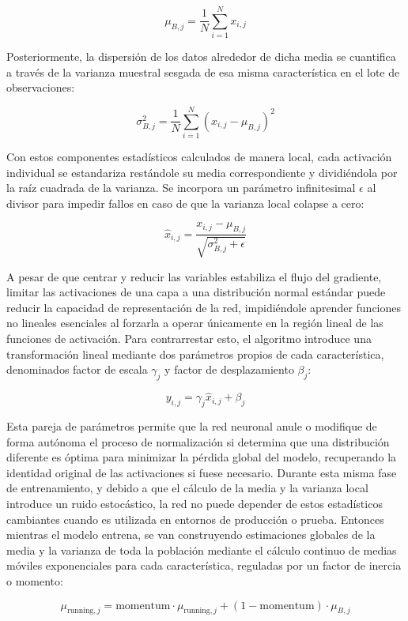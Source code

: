 \documentclass[12pt]{article}
\begin{document}
$$\mu_{B,j} = \frac{1}{N} \sum_{i=1}^{N} x_{i,j}$$

Posteriormente, la dispersión de los datos alrededor de dicha media se cuantifica a 
través de la varianza muestral sesgada de esa misma característica en el lote de observaciones:

$$\sigma_{B,j}^2 = \frac{1}{N} \sum_{i=1}^{N} (x_{i,j} - \mu_{B,j})^2$$

Con estos componentes estadísticos calculados de manera local, cada activación individual 
se estandariza restándole su media correspondiente y dividiéndola por la raíz cuadrada de 
la varianza. Se incorpora un parámetro infinitesimal $\epsilon$ al divisor para impedir 
fallos en caso de que la varianza local colapse a cero:

$$\hat{x}_{i,j} = \frac{x_{i,j} - \mu_{B,j}}{\sqrt{\sigma_{B,j}^2 + \epsilon}}$$

A pesar de que centrar y reducir las variables estabiliza el flujo del gradiente, 
limitar las activaciones de una capa a una distribución normal estándar puede reducir 
la capacidad de representación de la red, impidiéndole aprender funciones no lineales 
esenciales al forzarla a operar únicamente en la región lineal de las funciones de activación. 
Para contrarrestar esto, el algoritmo introduce una transformación lineal mediante dos 
parámetros propios de cada característica, denominados factor de escala $\gamma_j$ y factor 
de desplazamiento $\beta_j$:

$$y_{i,j} = \gamma_j \hat{x}_{i,j} + \beta_j$$

Esta pareja de parámetros permite que la red neuronal anule o modifique de forma autónoma 
el proceso de normalización si determina que una distribución diferente es óptima para 
minimizar la pérdida global del modelo, recuperando la identidad original de las activaciones 
si fuese necesario. Durante esta misma fase de entrenamiento, y debido a que el cálculo de la 
media y la varianza local introduce un ruido estocástico, la red no puede depender de estos 
estadísticos cambiantes cuando es utilizada en entornos de producción o prueba. Entonces 
mientras el modelo entrena, se van construyendo estimaciones globales de la media y la 
varianza de toda la población mediante el cálculo continuo de medias móviles exponenciales 
para cada característica, reguladas por un factor de inercia o momento:

$$\mu_{\text{running},j} = \text{momentum} \cdot \mu_{\text{running},j} + (1 - \text{momentum}) \cdot \mu_{B,j}$$
\end{document}
